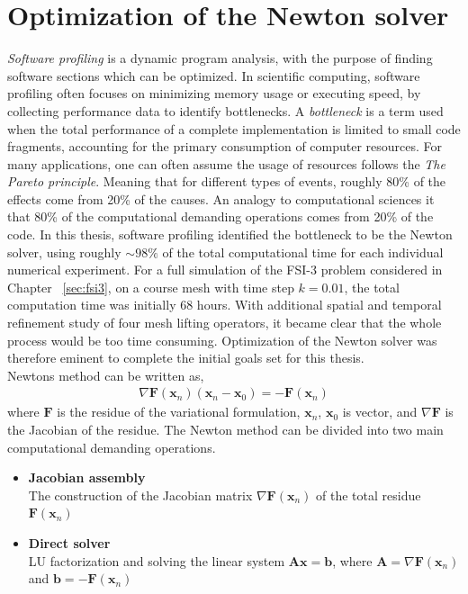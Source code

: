\section{Optimization of the Newton solver}
\label{sec:opti}
\textit{Software profiling} is a dynamic program analysis, with the purpose of finding software sections which can be optimized. In scientific computing, software profiling often focuses on minimizing memory usage or executing speed, by collecting performance data to identify bottlenecks. A \textit{bottleneck} is a term used when the total performance of a complete implementation is limited to small code fragments, accounting for the primary consumption of computer resources. For many applications, one can often assume the usage of resources follows the \textit{The Pareto principle}. Meaning that for different types of events, roughly 80\% of the effects come from 20\% of the causes. An analogy to computational sciences it that 80\% of the computational demanding operations comes from 20\% of the code. In this thesis, software profiling identified the bottleneck to be the Newton solver, using roughly $\sim 98 \%$ of the total computational time for each individual numerical experiment. For a full simulation of the FSI-3 problem considered in Chapter ~\ref{sec:fsi3}, on a course mesh with time step $k = 0.01$, the total computation time was initially 68 hours. With additional spatial and temporal refinement study of four mesh lifting operators, it became clear that the whole process would be too time consuming. Optimization of the Newton solver was therefore eminent to complete the initial goals set for this thesis. \\
Newtons method can be written as,
\begin{align}
\nabla \mathbf{F}(\mathbf{x}_n)(\mathbf{x}_n - \mathbf{x}_0) = - \mathbf{F}(\mathbf{x}_n)
\label{eq:newton}
\end{align}
where $\mathbf{F}$ is the residue of the variational formulation, $\mathbf{x}_n$, $\mathbf{x}_0$ is vector, and $ \nabla \mathbf{F}$ is the Jacobian of the residue. The Newton method can be divided into two main computational demanding operations.
\begin{itemize}
\item \textbf{Jacobian assembly} \\
The construction of the Jacobian matrix $\nabla \mathbf{F}(\mathbf{x}_n)$ of the total residue $\mathbf{F}(\mathbf{x}_n)$
\item \textbf{Direct solver} \\ 
LU factorization and solving the linear system $\mathbf{Ax} = \mathbf{b}$, where $\mathbf{A} = \nabla \mathbf{F}(\mathbf{x}_n)$ and $\mathbf{b} = - \mathbf{F}(\mathbf{x}_n) $
\end{itemize}
